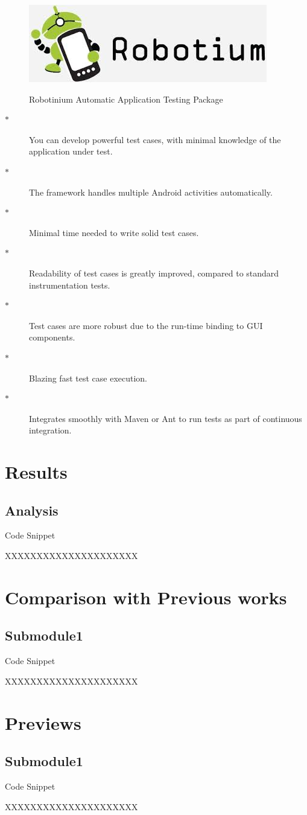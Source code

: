 \begin{figure} [ht]
\centering
\includegraphics[scale=0.5]{robotinium}\\
\caption{Robotinium Automatic Application Testing Package }
\label{the-label-for-cross-referencing}
\end{figure}

\begin{description}
 \item[$\ast$ ] You can develop powerful test cases, with minimal knowledge of the application under test.
 \item[$\ast$ ] The framework handles multiple Android activities automatically.
 \item[$\ast$ ] Minimal time needed to write solid test cases.
 \item[$\ast$ ] Readability of test cases is greatly improved, compared to standard instrumentation tests.
 \item[$\ast$ ] Test cases are more robust due to the run-time binding to GUI components.
 \item[$\ast$ ] Blazing fast test case execution.
 \item[$\ast$ ] Integrates smoothly with Maven or Ant to run tests as part of continuous integration.

\end{description}

\section{Results}

\subsection{Analysis}
Code Snippet

XXXXXXXXXXXXXXXXXXXXX

\section{Comparison with Previous works}

\subsection{Submodule1}
Code Snippet

XXXXXXXXXXXXXXXXXXXXX

\section{Previews}

\subsection{Submodule1}
Code Snippet

XXXXXXXXXXXXXXXXXXXXX



